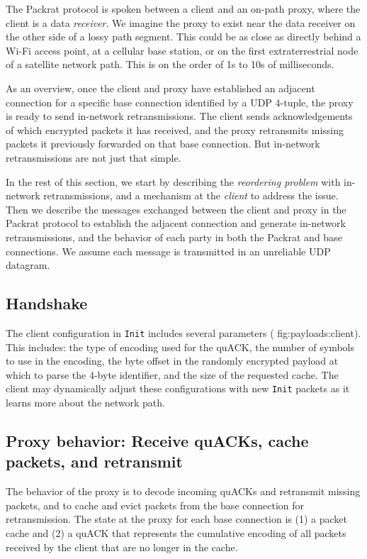 The Packrat protocol is spoken between a client and an on-path proxy, where the
client is a data \textit{receiver}. We imagine the proxy to exist near the data
receiver on the other side of a lossy path segment. This could be as close as
directly behind a Wi-Fi access point, at a cellular base station, or on the
first extraterrestrial node of a satellite network path. This is on the order
of 1s to 10s of milliseconds.

As an overview, once the client and proxy have established an adjacent
connection for a specific base connection identified by a UDP 4-tuple, the
proxy is ready to send in-network retransmissions. The client sends
acknowledgements of which encrypted packets it has received, and the proxy retransmits missing
packets it previously forwarded on that base connection.
But in-network retransmissions are not just that simple.

In the rest of this section, we start by describing the \textit
{reordering problem} with in-network retransmissions, and a mechanism at
the \textit{client} to address the issue. Then we describe the messages
exchanged between the client and proxy in the Packrat protocol to establish the
adjacent connection and generate in-network retransmissions,
and the behavior of each party in both the Packrat and base
connections. We assume each message is transmitted in an unreliable UDP
datagram.

\subsection{Handshake}

The client configuration in \texttt{Init} includes several parameters (\Cref
{fig:payloads:client}). This includes: the type of encoding used for the quACK,
the number of symbols to use in the encoding, the byte offset in the randomly
encrypted payload at which to parse the 4-byte identifier, and the size of the
requested cache. The client may dynamically adjust these configurations with
new \texttt{Init} packets as it learns more about the network path.

\subsection{Proxy behavior: Receive quACKs, cache packets, and retransmit}
\label{sec:packrat:protocol:proxy-behavior}

The behavior of the proxy is to decode incoming quACKs and retransmit missing
packets, and to cache and evict packets from the base connection for
retransmission. The state at the proxy for each base connection is (1) a packet
cache and (2) a quACK that represents the cumulative encoding of all packets
received by the client that are no longer in the cache.

